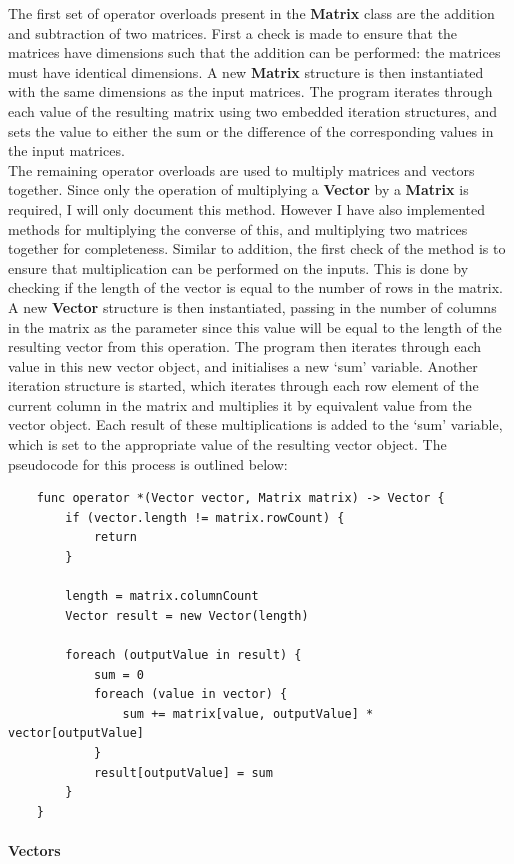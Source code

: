 \documentclass{article}
\begin{document}
The first set of operator overloads present in the \textbf{Matrix} class are the addition and subtraction of two matrices. First a check is made to ensure that the matrices have dimensions such that the addition can be performed: the matrices must have identical dimensions. A new \textbf{Matrix} structure is then instantiated with the same dimensions as the input matrices. The program iterates through each value of the resulting matrix using two embedded iteration structures, and sets the value to either the sum or the difference of the corresponding values in the input matrices. \\

The remaining operator overloads are used to multiply matrices and vectors together. Since only the operation of multiplying a \textbf{Vector} by a \textbf{Matrix} is required, I will only document this method. However I have also implemented methods for multiplying the converse of this, and multiplying two matrices together for completeness. Similar to addition, the first check of the method is to ensure that multiplication can be performed on the inputs. This is done by checking if the length of the vector is equal to the number of rows in the matrix. A new \textbf{Vector} structure is then instantiated, passing in the number of columns in the matrix as the parameter since this value will be equal to the length of the resulting vector from this operation. The program then iterates through each value in this new vector object, and initialises a new `sum' variable. Another iteration structure is started, which iterates through each row element of the current column in the matrix and multiplies it by equivalent value from the vector object. Each result of these multiplications is added to the `sum' variable, which is set to the appropriate value of the resulting vector object. The pseudocode for this process is outlined below:

\begin{verbatim}
	func operator *(Vector vector, Matrix matrix) -> Vector {
		if (vector.length != matrix.rowCount) {
			return
		}

		length = matrix.columnCount
		Vector result = new Vector(length)

		foreach (outputValue in result) {
			sum = 0
			foreach (value in vector) {
				sum += matrix[value, outputValue] * vector[outputValue]
			}
			result[outputValue] = sum
		}
	}
\end{verbatim}

\paragraph{Vectors\\}
\end{document}
